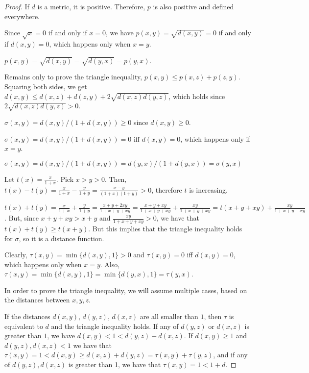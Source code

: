 \begin{proof}
If $d$ is a metric, it is positive. Therefore, $p$ is also positive and defined everywhere.

Since $\sqrt{x} = 0$ if and only if $x=0$, we have $p(x,y) = \sqrt{d(x,y)} = 0$ if and only if $d(x,y)=0$, which happens only when $x=y$. 

$p(x,y) = \sqrt{d(x,y)} = \sqrt{d(y,x)} = p(y,x)$.

Remains only to prove the triangle inequality, $p(x,y) \leq p(x,z) + p(z,y)$. Squaring both sides, we get $d(x,y) \leq d(x,z) + d(z,y) + 2\sqrt{d(x,z)d(y,z)}$, which holds since $2\sqrt{d(x,z)d(y,z)} > 0$. 

\vspace{1em}

$\sigma(x,y) =  d(x , y)/(1+ d(x, y)) \geq 0$ since $d(x,y) \geq 0$.

$\sigma(x,y) = d(x , y)/(1+ d(x, y)) = 0$ iff $d(x,y) = 0$, which happens only if $x=y$.

$\sigma(x,y) = d(x , y)/(1+ d(x, y)) = d(y , x)/(1+ d(y, x)) = \sigma(y,x)$

Let $t(x) = \frac{x}{1+x}$. Pick $x>y>0$. Then, $t(x) - t(y) = \frac{x}{1+x} - \frac{y}{1+y} = \frac{x-y}{(1+x)(1+y)} > 0$, therefore $t$ is increasing.

$t(x) + t(y) = \frac{x}{1+x} + \frac{y}{1+y} = \frac{x+y+2xy}{1+x+y+xy} = \frac{x+y+xy}{1+x+y+xy} + \frac{xy}{1+x+y+xy} = t(x+y+xy) + \frac{xy}{1+x+y+xy}$. But, since $x+y+xy > x+y$ and $\frac{xy}{1+x+y+xy} > 0$, we have that $t(x) + t(y) \geq t(x+y)$. But this implies that the triangle inequality holds for $\sigma$, so it is a distance function.

\vspace{1em}

Clearly, $\tau(x, y) = \min\{d(x , y), 1\} > 0$ and $\tau(x,y) = 0$ iff $d(x,y) = 0$, which happens only when $x=y$. Also, $\tau(x, y) = \min\{d(x , y), 1\} = \min\{d(y , x), 1\} = \tau(y, x)$.

In order to prove the triangle inequality, we will assume multiple cases, based on the distances between $x,y,z$.

If the distances $d(x,y)$, $d(y,z)$, $d(x,z)$ are all smaller than $1$, then $\tau$ is equivalent to $d$ and the triangle inequality holds. If any of $d(y,z)$ or $d(x,z)$ is greater than $1$, we have $d(x,y) < 1 < d(y,z) + d(x,z)$. If $d(x,y) \geq 1$ and $d(y,z), d(x,z) < 1$ we have that $\tau(x,y) = 1 < d(x,y) \geq d(x,z) + d(y,z) = \tau(x,y) + \tau(y,z)$, and if any of $d(y,z), d(x,z)$ is greater than 1, we have that $\tau(x,y) = 1 < 1 + d$.

\end{proof}



